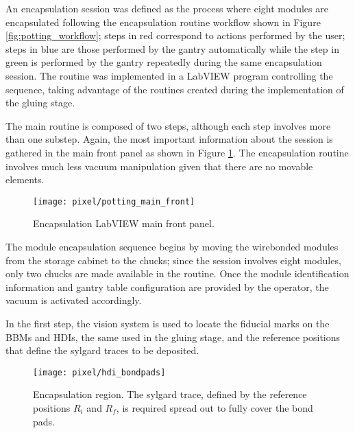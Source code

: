 An encapsulation session was defined as the process where eight modules are encapsulated following the encapsulation routine workflow shown in Figure \ref{fig:potting_workflow}; steps in red correspond to actions performed by the user; steps in blue are those performed by the gantry automatically while the step in green is performed by the gantry repeatedly during the same encapsulation session. The routine was implemented in a LabVIEW program controlling the sequence, taking advantage of the routines created during the implementation of the gluing stage.   

The main routine is composed of two steps, although each step involves more than one substep. Again, the most important information about the session is gathered in the main front panel as shown in Figure \ref{fig:potting_main_front}. The encapsulation routine involves much less vacuum manipulation given that there are no movable elements.

\begin{landscape}
\begin{figure}[h]
\begin{center}
    \vspace{-2.9cm}
    \hspace{-1cm}
    \texttt{[image: pixel/potting\_main\_front]}
    \caption[Encapsulation LabVIEW main front panel]{Encapsulation LabVIEW main front panel.}\label{fig:potting_main_front}
    \vspace{-2cm}
    \hspace{-2cm}
\end{center}
\end{figure}
\end{landscape}

The module encapsulation sequence begins by moving the wirebonded modules from the storage cabinet to the chucks; since the session involves eight modules, only two chucks are made available in the routine. Once the module identification information and gantry table configuration are provided by the operator, the vacuum is activated accordingly.

In the first step, the vision system is used to locate the fiducial marks on the BBMs and HDIs, the same used in the gluing stage, and the reference positions that define the sylgard traces to be deposited. 

\begin{figure}[h]
\begin{center}
  \texttt{[image: pixel/hdi\_bondpads]}
 \caption[Encapsulation region.]{Encapsulation region. The sylgard trace, defined by the reference positions $R_i$ and $R_f$, is required spread out to fully cover the bond pads. }\label{fig:hdi_bondpads}
\end{center}
\end{figure}

